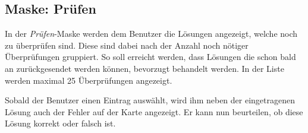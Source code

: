 \subsection{Maske: Prüfen}
In der \emph{Prüfen}-Maske werden dem Benutzer die Lösungen angezeigt, welche noch zu überprüfen sind.
Diese sind dabei nach der Anzahl noch nötiger Überprüfungen gruppiert.
So soll erreicht werden, dass Lösungen die schon bald an  zurückgesendet werden können, bevorzugt behandelt werden.
In der Liste werden maximal 25 Überprüfungen angezeigt.

Sobald der Benutzer einen Eintrag auswählt, wird ihm neben der eingetragenen Lösung auch der Fehler auf der Karte angezeigt.
Er kann nun beurteilen, ob diese Lösung korrekt oder falsch ist.

\begin{figure}[H]
\hfill
{}

\end{figure}
